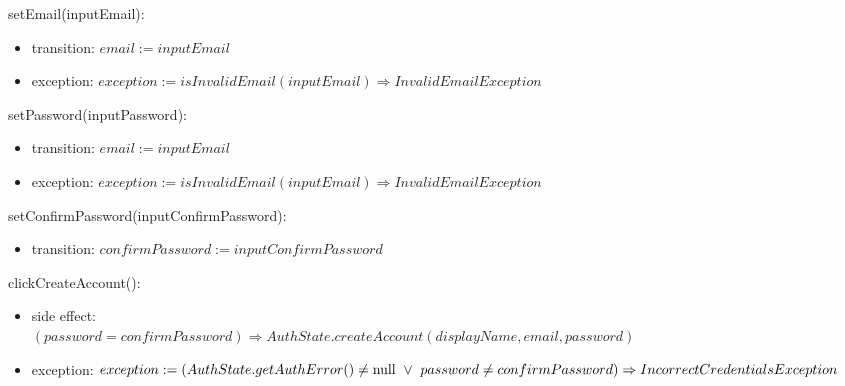 \documentclass[12pt, titlepage]{article}
\begin{document}
\noindent setEmail(inputEmail):
\begin{itemize}
\item transition: $email := inputEmail$
\item exception: $exception := isInvalidEmail(inputEmail) \Rightarrow InvalidEmailException$
\end{itemize}

\noindent setPassword(inputPassword):
\begin{itemize}
\item transition: $email := inputEmail$
\item exception: $exception := isInvalidEmail(inputEmail) \Rightarrow InvalidEmailException$
\end{itemize}

\noindent setConfirmPassword(inputConfirmPassword):
\begin{itemize}
\item transition: $confirmPassword := inputConfirmPassword$
\end{itemize}

\noindent clickCreateAccount():
\begin{itemize}
\item side effect: \\$(password = confirmPassword) \Rightarrow AuthState.createAccount(displayName, email, password)$
\item exception: $exception := (AuthState.getAuthError() \neq \text{null} \ \lor  \ password \neq confirmPassword) \\ \Rightarrow IncorrectCredentialsException$ 
\end{itemize}
\end{document}
